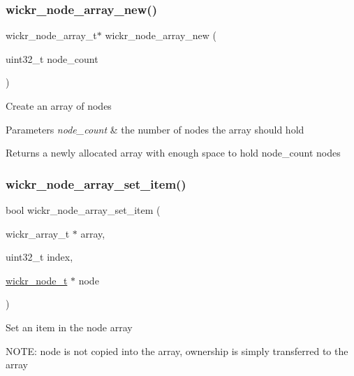 \subsubsection{\texorpdfstring{wickr\+\_\+node\+\_\+array\+\_\+new()}{wickr\_node\_array\_new()}}
{\footnotesize\ttfamily wickr\+\_\+node\+\_\+array\+\_\+t$\ast$ wickr\+\_\+node\+\_\+array\+\_\+new (\begin{DoxyParamCaption}\item[{uint32\+\_\+t}]{node\+\_\+count }\end{DoxyParamCaption})}

Create an array of nodes


\begin{DoxyParams}{Parameters}
{\em node\+\_\+count} & the number of nodes the array should hold \\
\hline
\end{DoxyParams}
\begin{DoxyReturn}{Returns}
a newly allocated array with enough space to hold \textquotesingle{}node\+\_\+count\textquotesingle{} nodes 
\end{DoxyReturn}
\mbox{\label{group__wickr__node_gae511a75489982fc2e90271be63d9d753}} 
\subsubsection{\texorpdfstring{wickr\+\_\+node\+\_\+array\+\_\+set\+\_\+item()}{wickr\_node\_array\_set\_item()}}
{\footnotesize\ttfamily bool wickr\+\_\+node\+\_\+array\+\_\+set\+\_\+item (\begin{DoxyParamCaption}\item[{wickr\+\_\+array\+\_\+t $\ast$}]{array,  }\item[{uint32\+\_\+t}]{index,  }\item[{\hyperlink{structwickr__node}{wickr\+\_\+node\+\_\+t} $\ast$}]{node }\end{DoxyParamCaption})}

Set an item in the node array

N\+O\+TE\+: \textquotesingle{}node\textquotesingle{} is not copied into the array, ownership is simply transferred to the array


